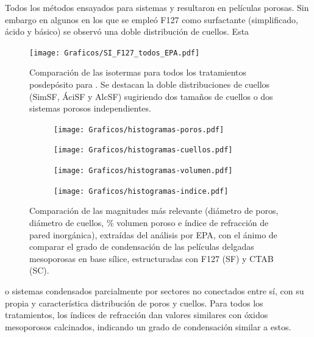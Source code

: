 		Todos los métodos ensayados para sistemas \pdmF\space y \pdmC\space resultaron en películas porosas. Sin embargo en algunos en los que se empleó F127 como surfactante (simplificado, ácido y básico) se observó una doble distribución de cuellos. Esta
			
			\clearpage	   
			\begin{figure}[ht!]
		 	   	   \begin{center}
		 	   	   \texttt{[image: Graficos/SI\_F127\_todos\_EPA.pdf]}
			   	   \caption[Comparación PEA tratamientos alternativos (F127)]{Comparación de las isotermas para todos los tratamientos posdepósito para \pdmF. Se destacan la doble distribuciones de cuellos (SimSF, ÁciSF y AlcSF) sugiriendo dos tamaños de cuellos o dos sistemas porosos independientes.}
				   \label{fig:todos_EPA_F127}	
				   \end{center}
				   \end{figure}	

				   \begin{figure}[ht!]   
				 	   	    \begin{subfigure}[t]{0.5\textwidth}
				        	\texttt{[image: Graficos/histogramas-poros.pdf]}
				       		\end{subfigure}
				         	\begin{subfigure}[t]{0.5\textwidth}
				        	\texttt{[image: Graficos/histogramas-cuellos.pdf]}
				       		\end{subfigure}
				         	 \begin{subfigure}[t]{0.5\textwidth}
				        	\texttt{[image: Graficos/histogramas-volumen.pdf]}
				       		\end{subfigure}
				         	\begin{subfigure}[t]{0.5\textwidth}
				        	\texttt{[image: Graficos/histogramas-indice.pdf]}
				       		\end{subfigure}
				     		\caption[Comparación del grado de condensación de \pdm]{Comparación de las magnitudes más relevante (diámetro de poros, diámetro de cuellos, \% volumen poroso e índice de refracción de pared inorgánica), extraídas del análisis por EPA, con el ánimo de comparar el grado de condensación de las películas delgadas mesoporosas en base sílice, estructuradas con F127 (SF) y CTAB (SC).}
				     		\label{fig:histogramas}
				     		\end{figure}
        \noindent o sistemas condensados parcialmente por sectores no conectados entre sí, con su propia y característica distribución de poros y cuellos. Para todos los tratamientos, los índices de refracción dan valores similares con óxidos mesoporosos calcinados, indicando un grado de condensación similar a estos. 			

